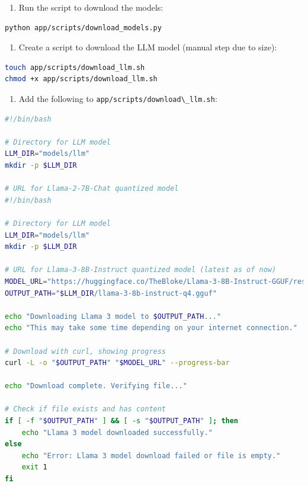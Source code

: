 \documentclass[
  screen,review,acmlarge]{acmart}
\newcommand{\passthrough}[1]{#1}
\providecommand{\tightlist}{%
  \setlength{\itemsep}{0pt}\setlength{\parskip}{0pt}}
\begin{document}
\begin{enumerate}
\def\labelenumi{\arabic{enumi}.}
\setcounter{enumi}{4}
\tightlist
\item
  Run the script to download the models:
\end{enumerate}

\begin{lstlisting}[language=bash]
python app/scripts/download_models.py
\end{lstlisting}

\begin{enumerate}
\def\labelenumi{\arabic{enumi}.}
\setcounter{enumi}{5}
\tightlist
\item
  Create a script to download the LLM model (manual step due to size):
\end{enumerate}

\begin{lstlisting}[language=bash]
touch app/scripts/download_llm.sh
chmod +x app/scripts/download_llm.sh
\end{lstlisting}

\begin{enumerate}
\def\labelenumi{\arabic{enumi}.}
\setcounter{enumi}{6}
\tightlist
\item
  Add the following to \passthrough{\lstinline!app/scripts/download\_llm.sh!}:
\end{enumerate}

\begin{lstlisting}[language=bash]
#!/bin/bash

# Directory for LLM model
LLM_DIR="models/llm"
mkdir -p $LLM_DIR

# URL for Llama-2-7B-Chat quantized model
#!/bin/bash

# Directory for LLM model
LLM_DIR="models/llm"
mkdir -p $LLM_DIR

# URL for Llama-3-8B-Instruct quantized model (latest as of now)
MODEL_URL="https://huggingface.co/TheBloke/Llama-3-8B-Instruct-GGUF/resolve/main/llama-3-8b-instruct.Q4_K_M.gguf"
OUTPUT_PATH="$LLM_DIR/llama-3-8b-instruct-q4.gguf"

echo "Downloading Llama 3 model to $OUTPUT_PATH..."
echo "This may take some time depending on your internet connection."

# Download with curl, showing progress
curl -L -o "$OUTPUT_PATH" "$MODEL_URL" --progress-bar

echo "Download complete. Verifying file..."

# Check if file exists and has content
if [ -f "$OUTPUT_PATH" ] && [ -s "$OUTPUT_PATH" ]; then
    echo "Llama 3 model downloaded successfully."
else
    echo "Error: Llama 3 model download failed or file is empty."
    exit 1
fi
\end{lstlisting}
\end{document}
